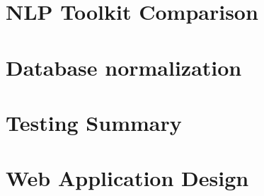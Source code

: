 \documentclass[11pt,a4paper]{book}
\begin{document}
\section{NLP Toolkit Comparison}
\label{appendix:comparison}

\section{Database normalization}
\label{appendix:normal}

\section{Testing Summary}
\label{appendix:testSummary}

\section{Web Application Design}
\label{appendix:webUI}

\end{document}
